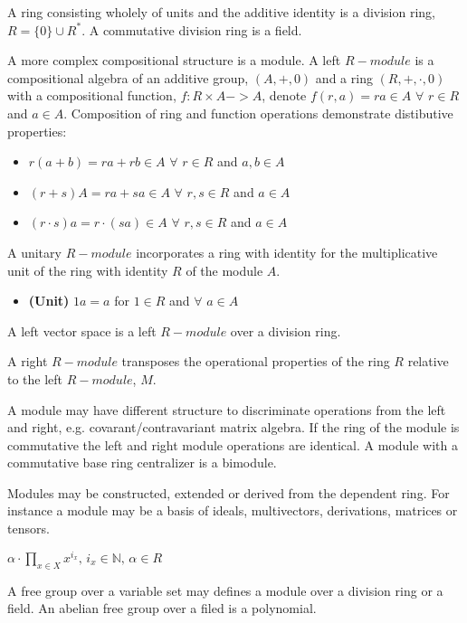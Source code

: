 \documentclass[aps,twocolumn,secnumarabic,nobalancelastpage,amsmath,amssymb,
nofootinbib,parskip=full]{revtex4}
\begin{document}
A ring consisting wholely of units and the additive identity is a division ring,
$R=\{0\}\cup R^*$. A commutative division ring is a field.

A more complex compositional structure is a module.
A left $R-module$ is a compositional algebra
of an additive group, $(A,+,0)$ and a ring $(R,+,\cdot,0)$
with a compositional function, $f{:}R\times A -> A$,
denote $f(r,a)=ra\in A$ $\forall$ $r\in R$ and $a\in A$.
Composition of ring and function operations demonstrate 
distibutive properties:

\begin{itemize}
\item $r(a+b)=ra + rb\in A$ $\forall$ $r\in R$ and $a,b\in A$
\item $(r+s)A=ra+sa\in A$ $\forall$ $r,s\in R$ and $a\in A$
\item $(r\cdot s)a=r\cdot (sa)\in A$ $\forall$ $r,s\in R$ and $a\in A$
\end{itemize}

A unitary $R-module$ incorporates a ring with identity for the multiplicative unit
of the ring with identity $R$ of the module $A$.

\begin{itemize}
\item \textbf{\small (Unit)} $1a=a$ for $1\in R$ and $\forall$ $a\in A$
\end{itemize}

A left vector space is a left $R-module$ over a division ring.

A right $R-module$ transposes the operational properties of the ring $R$
relative to the left $R-module$, $M$.

A module may have different structure to discriminate 
operations from the left and right, e.g. covarant/contravariant matrix algebra.
If the ring of the module is commutative the left and right module
operations are identical. A module with a commutative base ring centralizer
is a bimodule.

Modules may be constructed, extended or derived from the dependent ring. For instance
a module may be a basis of ideals, multivectors, derivations, matrices or tensors.

\begin{center}
$\alpha\cdot\prod_{x\in X}x^{i_x},\,i_x\in\mathbb{N},\,\alpha\in R$
\end{center}

A free group over a variable set may defines a module over
a division ring or a field. An abelian free group over a filed
is a polynomial.
\end{document}
